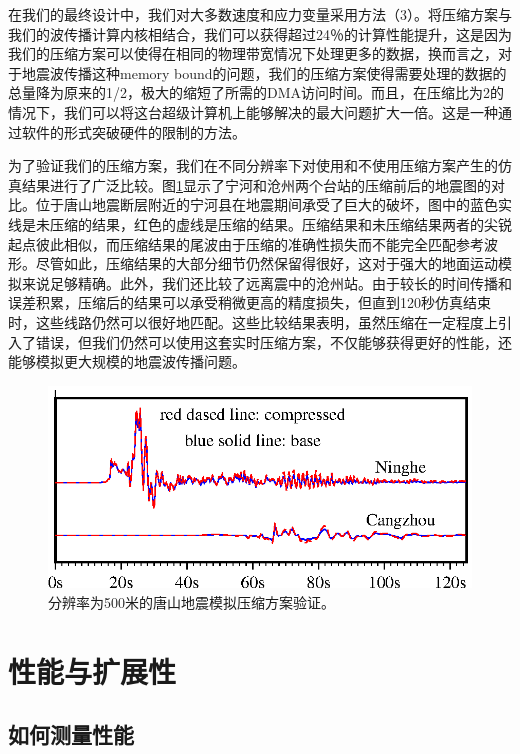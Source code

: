 \documentclass[degree=doctor]{thuthesis}
\begin{document}
在我们的最终设计中，我们对大多数速度和应力变量采用方法（3）。将压缩方案与我们的波传播计算内核相结合，我们可以获得超过24％的计算性能提升，这是因为我们的压缩方案可以使得在相同的物理带宽情况下处理更多的数据，换而言之，对于地震波传播这种memory bound的问题，我们的压缩方案使得需要处理的数据的总量降为原来的1/2，极大的缩短了所需的DMA访问时间。而且，在压缩比为2的情况下，我们可以将这台超级计算机上能够解决的最大问题扩大一倍。这是一种通过软件的形式突破硬件的限制的方法。


为了验证我们的压缩方案，我们在不同分辨率下对使用和不使用压缩方案产生的仿真结果进行了广泛比较。图\ref {fig:compress_valid}显示了宁河和沧州两个台站的压缩前后的地震图的对比。位于唐山地震断层附近的宁河县在地震期间承受了巨大的破坏，图中的蓝色实线是未压缩的结果，红色的虚线是压缩的结果。压缩结果和未压缩结果两者的尖锐起点彼此相似，而压缩结果的尾波由于压缩的准确性损失而不能完全匹配参考波形。尽管如此，压缩结果的大部分细节仍然​​保留得很好，这对于强大的地面运动模拟来说足够精确。此外，我们还比较了远离震中的沧州站。由于较长的时间传播和误差积累，压缩后的结果可以承受稍微更高的精度损失，但直到120秒仿真结束时，这些线路仍然可以很好地匹配。这些比较结果表明，虽然压缩在一定程度上引入了错误，但我们仍然可以使用这套实时压缩方案，不仅能够获得更好的性能，还能够模拟更大规模的地震波传播问题。

\begin{figure}[ht]
\centering
\includegraphics[width=0.9\columnwidth]{CompareCompress.eps}
\caption{分辨率为500米的唐山地震模拟压缩方案验证。}
\label{fig:compress_valid}
\end{figure}

\section{性能与扩展性}

\subsection{如何测量性能}
\end{document}
